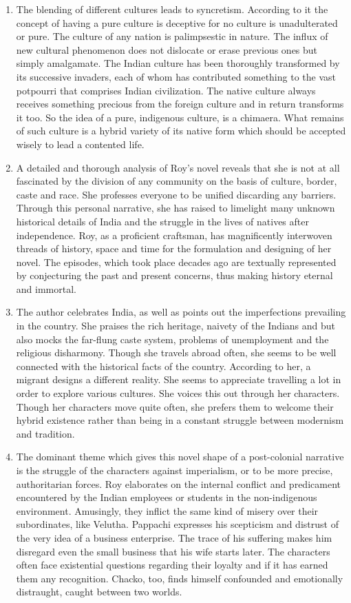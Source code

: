 \begin{enumerate}
  \item The blending of different cultures leads to syncretism.  According to it the concept of having a pure culture is deceptive for no culture is unadulterated or pure.  The culture of any nation is palimpsestic in nature.  The influx of new cultural phenomenon does not dislocate or erase previous ones but simply amalgamate.   The Indian culture has been thoroughly transformed by its successive invaders, each of whom has contributed something to the vast potpourri that comprises Indian civilization.  The native culture always receives something precious from the foreign culture and in return transforms it too.   So the idea of a pure, indigenous culture, is a chimaera. What remains of such culture is a hybrid variety of its native form which should be accepted wisely to lead a contented life.

  \item A detailed and thorough analysis of Roy’s novel reveals that she is not at all fascinated by the division of any community on the basis of culture, border, caste and race.  She professes everyone to be unified discarding any barriers.  Through this personal narrative, she has raised to limelight many unknown historical details of India and the struggle in the lives of natives after independence.  Roy, as a proficient craftsman, has magnificently interwoven threads of history, space and time for the formulation and designing of her novel.  The episodes, which took place decades ago are textually represented by conjecturing the past and present concerns, thus making history eternal and immortal.

  \item The author celebrates India, as well as points out the imperfections prevailing in the country.  She praises the rich heritage, naivety of the Indians and but also mocks the far-flung caste system, problems of unemployment and the religious disharmony.  Though she travels abroad often, she seems to be well connected with the historical facts of the country.  According to her, a migrant designs a different reality. She seems to appreciate travelling a lot in order to explore various cultures. She voices this out through her characters. Though her characters move quite often, she prefers them to welcome their hybrid existence rather than being in a constant struggle between modernism and tradition.

  \item The dominant theme which gives this novel shape of a post-colonial narrative is the struggle of the characters against imperialism, or to be more precise, authoritarian forces. Roy elaborates on the internal conflict and predicament encountered by the Indian employees or students in the non-indigenous environment. Amusingly, they inflict the same kind of misery over their subordinates, like Velutha. Pappachi expresses his scepticism and distrust of the very idea of a business enterprise. The trace of his suffering makes him disregard even the small business that his wife starts later. The characters often face existential questions regarding their loyalty and if it has earned them any recognition. Chacko, too, finds himself confounded and emotionally distraught, caught between two worlds.


\end{enumerate}
